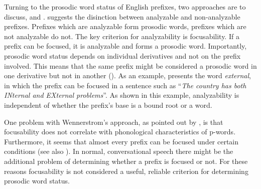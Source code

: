 Turning to the prosodic word status of English prefixes, two approaches are to discuss,  \cite{Wennerstrom.1993} and \cite{Raffelsiefen.1999}. \cite{Wennerstrom.1993} suggests the disinction between analyzable and non-analyzable prefixes. Prefixes which are analyzable form prosodic words, prefixes which are not analyzable do not. The key criterion for analyzability is focusability. If a prefix can be focused, it is analyzable and forms a prosodic word. 
Importantly, prosodic word status depends on individual derivatives and not on the prefix involved. This means that the same prefix might be considered a prosodic word in one derivative but not in another (\citealt[314]{Wennerstrom.1993}). 
As an example, \citet[311]{Wennerstrom.1993} presents the word \textit{external}, in which the prefix  can be focused in a sentence such as ``\textit{The country has both INternal and EXternal problems}''. As shown in this example, analyzability is independent of whether the prefix's base is a bound root or a word. 

One problem with Wennerstrom's approach, as pointed out by \citet[161 f.]{Raffelsiefen.1999}, is that focusability does not correlate with phonological characteristics of p-words. Furthermore, it seems that almost every prefix can be focused under certain conditions (see also \citealt[chapter 4]{Plag.2003}). In normal, conversational speech there might be the additional problem of determining whether a prefix is focused or not. For these reasons focusability is not considered a useful, reliable criterion for determining prosodic word status.

